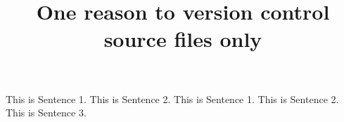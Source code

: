 \documentclass{article}
\title{One reason to version control source files only}
\begin{document}
\maketitle


This is Sentence 1.
This is Sentence 2.
This is Sentence 1.
This is Sentence 2.
This is Sentence 3.
\end{document}
